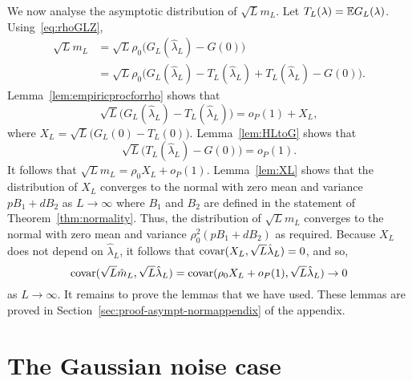 \documentclass[journal]{IEEEtran}
\begin{document}
We now analyse the asymptotic distribution of $\sqrt{L} m_L$.  Let $T_L(\lambda) = {\mathbb E} G_L(\lambda)$.  Using~\eqref{eq:rhoGLZ},
\begin{align*}
\sqrt{L} m_L &= \sqrt{L} \rho_0 \big( G_L(\hat{\lambda}_L) - G(0) \big) \\
&= \sqrt{L} \rho_0 \big( G_L(\hat{\lambda}_L) - T_L(\hat{\lambda}_L) + T_L(\hat{\lambda}_L) - G(0) \big).
\end{align*}
Lemma~\ref{lem:empiricprocforrho} shows that 
\[
\sqrt{L}\big( G_L(\hat{\lambda}_L) - T_L(\hat{\lambda}_L)  \big) = o_P(1) + X_L,
\]
where $X_L = \sqrt{L}\big( G_L(0) - T_L(0)  \big)$.  Lemma~\ref{lem:HLtoG} shows that
\[
\sqrt{L}\big( T_L(\hat{\lambda}_L) - G(0) \big) = o_P(1).
\]
It follows that $\sqrt{L} m_L =  \rho_0 X_L + o_P(1)$.  Lemma~\ref{lem:XL} shows that the distribution of $X_L$ converges to the normal with zero mean and variance $p B_1 + d B_2$ as $L\rightarrow\infty$ where $B_1$ and $B_2$ are defined in the statement of Theorem~\ref{thm:normality}.  Thus, the distribution of $\sqrt{L} m_L$ converges to the normal with zero mean and variance $\rho_0^2(p B_1 + d B_2)$ as required.  Because $X_L$ does not depend on $\hat{\lambda}_L$, it follows that $\operatorname{covar}(X_L, \sqrt{L}\hat{\lambda}_L) = 0$, and so,
\[
\operatorname{covar}(\sqrt{L}\hat{m}_L, \sqrt{L}\hat{\lambda}_L) = \operatorname{covar}(\rho_0 X_L + o_P(1), \sqrt{L}\hat{\lambda}_L) \rightarrow 0
\]
as $L \rightarrow \infty$.  It remains to prove the lemmas that we have used.  These lemmas are proved in Section~\ref{sec:proof-asympt-normappendix} of the appendix.



\section{The Gaussian noise case}\label{sec:gaussian-noise-case}
\end{document}
